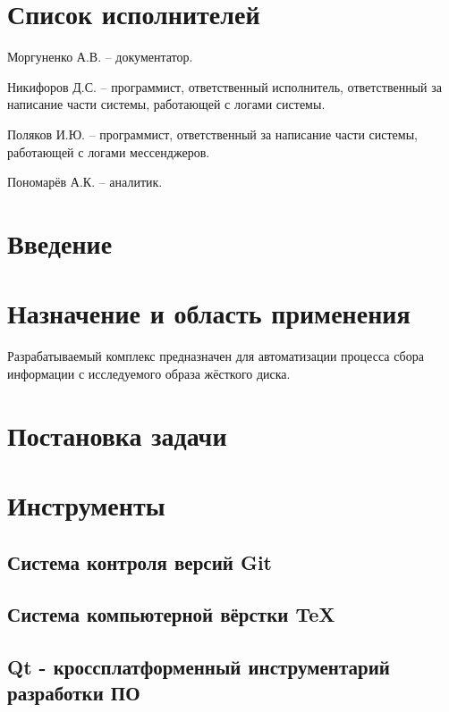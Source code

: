 






\newpage
{}
\section*{Список исполнителей}

Моргуненко А.В. -- документатор.

Никифоров Д.С. -- программист, ответственный исполнитель, ответственный за написание части системы, работающей с логами системы.

Поляков И.Ю. -- программист, ответственный за написание части системы, работающей с логами мессенджеров.

Пономарёв А.К. -- аналитик.

\newpage
{}
\tableofcontents

\newpage
{}
\section*{Введение}


\section{Назначение и область применения}
Разрабатываемый комплекс предназначен для автоматизации процесса сбора информации с исследуемого образа жёсткого диска.
\section{Постановка задачи}
\setcounter{figure}{0}

\section{Инструменты}
\setcounter{figure}{0}
\subsection{Система контроля версий Git}

\subsection{Система компьютерной вёрстки \TeX}

\subsection{Qt - кроссплатформенный инструментарий разработки ПО}


